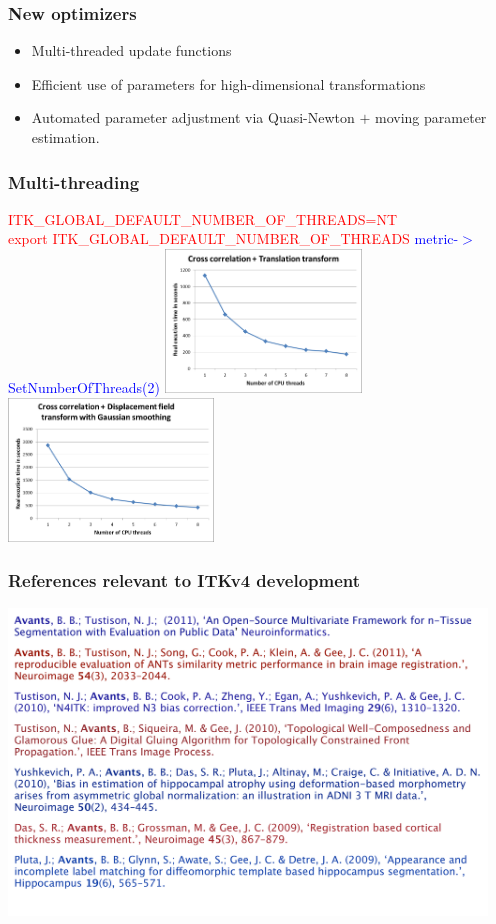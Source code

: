 \begin{frame}
\frametitle{New optimizers}
\Large
\begin{itemize}
\item Multi-threaded update functions
\item Efficient use of parameters for high-dimensional transformations
\item Automated parameter adjustment via Quasi-Newton $+$ moving parameter estimation.
\end{itemize}
\end{frame}

\begin{frame}
\Large
\frametitle{Multi-threading}
\textcolor{red}{ ITK\_GLOBAL\_DEFAULT\_NUMBER\_OF\_THREADS=NT}\\
\textcolor{red}{export ITK\_GLOBAL\_DEFAULT\_NUMBER\_OF\_THREADS}
\newline
\newline
\textcolor{blue}{metric-$>$SetNumberOfThreads(2)}
\includegraphics[height=1.5in]{../Art/cctran}~~\includegraphics[height=1.5in]{../Art/ccfield}
\end{frame}

\begin{frame}
\Large
\frametitle{References relevant to ITKv4 development}
\includegraphics[height=3.2in]{../Art/registration_references}
\end{frame}


